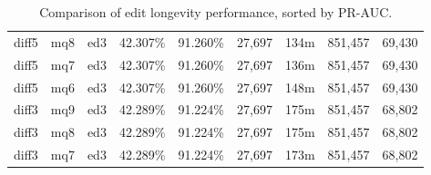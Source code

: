\begin{sidewaystable}[!ph]
\begin{center}
\begin{tabular}{|c|c|c||c|c||c|c|c|c|}
diff5 & mq8 & ed3 & 42.307\% & 91.260\% & 27,697 & 134m & 851,457 & 69,430 \\
diff5 & mq7 & ed3 & 42.307\% & 91.260\% & 27,697 & 136m & 851,457 & 69,430 \\
diff5 & mq6 & ed3 & 42.307\% & 91.260\% & 27,697 & 148m & 851,457 & 69,430 \\
diff3 & mq9 & ed3 & 42.289\% & 91.224\% & 27,697 & 175m & 851,457 & 68,802 \\
diff3 & mq8 & ed3 & 42.289\% & 91.224\% & 27,697 & 175m & 851,457 & 68,802 \\
diff3 & mq7 & ed3 & 42.289\% & 91.224\% & 27,697 & 173m & 851,457 & 68,802 \\
\hline
\end{tabular}
\end{center}
\caption{Comparison of edit longevity performance,
    sorted by PR-AUC.}
\label{tab:editshoutF}
\end{sidewaystable}
\clearpage
